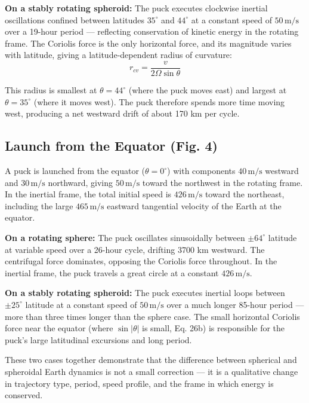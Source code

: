 \documentclass[10pt, a4paper]{article}
\begin{document}
\textbf{On a stably rotating spheroid: }The puck executes clockwise inertial oscillations confined between latitudes $35^{\circ}$ and $44^{\circ}$ at a constant speed of $50\,\text{m/s}$ over a 19-hour period — reflecting conservation of kinetic energy in the rotating frame. The Coriolis force is the only horizontal force, and its magnitude varies with latitude, giving a latitude-dependent radius of curvature: 
\begin{equation}
r_{cv} = \frac{v}{2\Omega\sin\theta} \label{eq:59}
\end{equation}

This radius is smallest at $\theta = 44^{\circ}$ (where the puck moves east) and largest at $\theta = 35^{\circ}$ (where it moves west). The puck therefore spends more time moving west, producing a net westward drift of about 170 km per cycle.

\subsection{Launch from the Equator (Fig. 4)}
A puck is launched from the equator ($\theta = 0^{\circ}$) with components $40\,\text{m/s}$ westward and $30\,\text{m/s}$ northward, giving $50\,\text{m/s}$ toward the northwest in the rotating frame. In the inertial frame, the total initial speed is $426\,\text{m/s}$ toward the northeast, including the large $465\,\text{m/s}$ eastward tangential velocity of the Earth at the equator. 

\textbf{On a rotating sphere: }The puck oscillates sinusoidally between $\pm 64^{\circ}$ latitude at variable speed over a 26-hour cycle, drifting 3700 km westward. The centrifugal force dominates, opposing the Coriolis force throughout. In the inertial frame, the puck travels a great circle at a constant $426\,\text{m/s}$. 

\textbf{On a stably rotating spheroid: }The puck executes inertial loops between $\pm 25^{\circ}$ latitude at a constant speed of $50\,\text{m/s}$ over a much longer 85-hour period — more than three times longer than the sphere case. The small horizontal Coriolis force near the equator (where $\sin|\theta|$ is small, Eq. 26b) is responsible for the puck’s large latitudinal excursions and long period. 

These two cases together demonstrate that the difference between spherical and spheroidal Earth dynamics is not a small correction — it is a qualitative change in trajectory type, period, speed profile, and the frame in which energy is conserved.
\end{document}
